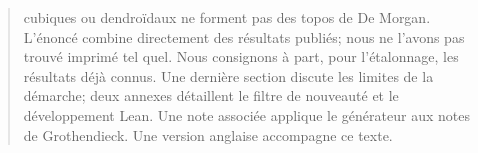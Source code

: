 \begin{abstract}
cubiques ou dendroïdaux ne forment pas des topos de De Morgan. L'énoncé combine directement des résultats publiés; nous ne l'avons pas trouvé imprimé tel quel. Nous consignons à part, pour l'étalonnage, les résultats déjà connus. Une dernière section discute les limites de la démarche; deux annexes détaillent le filtre de nouveauté et le développement Lean. Une note associée applique le générateur aux notes de Grothendieck. Une version anglaise accompagne ce texte.
\end{abstract}
